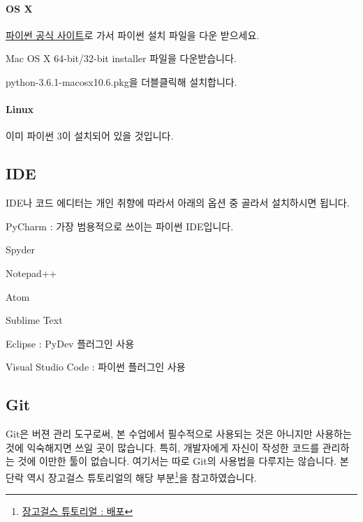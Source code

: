 \paragraph{OS X} 

\href{https://www.python.org/downloads/}{파이썬 공식 사이트}로 가서 파이썬 설치 파일을 다운 받으세요. 

\begin{compactitem}
\item Mac OS X 64-bit/32-bit installer 파일을 다운받습니다.
\item python-3.6.1-macosx10.6.pkg을 더블클릭해 설치합니다.
\end{compactitem}

\paragraph{Linux} 

이미 파이썬 3이 설치되어 있을 것입니다. 

\subsection{IDE}

IDE나 코드 에디터는 개인 취향에 따라서 아래의 옵션 중 골라서 설치하시면 됩니다. 

\begin{compactitem} 
\item PyCharm : 가장 범용적으로 쓰이는 파이썬 IDE입니다. 
\item Spyder 
\item Notepad++ 
\item Atom 
\item Sublime Text 
\item Eclipse : PyDev 플러그인 사용 
\item Visual Studio Code : 파이썬 플러그인 사용
\end{compactitem} 

\subsection{Git}

Git은 버젼 관리 도구로써, 본 수업에서 필수적으로 사용되는 것은 아니지만 사용하는 것에 익숙해지면 쓰일 곳이 많습니다. 특히, 개발자에게 자신이 작성한 코드를 관리하는 것에 이만한 툴이 없습니다. 여기서는 따로 Git의 사용법을 다루지는 않습니다. 본 단락 역시 장고걸스 튜토리얼의 해당 부분\footnote{\href{https://tutorial.djangogirls.org/ko/deploy/}{장고걸스 튜토리얼 : 배포}}을 참고하였습니다. 

